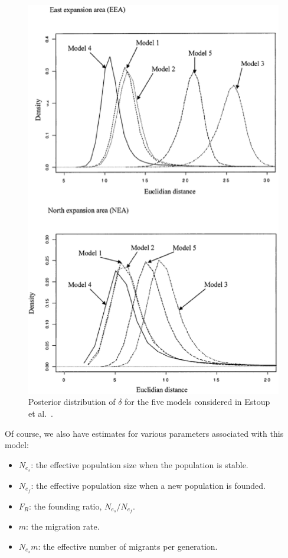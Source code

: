 \begin{figure}
\begin{center}
\includegraphics[width=4.5in]{cane-toad-models.eps}
\end{center}
\caption{Posterior distribution of $\delta$ for the five models
  considered in Estoup et al.~\cite{Estoup-etal-2004}.}\label{fig:cane-toad-models}
\end{figure}

Of course, we also have estimates for various parameters associated
with this model: 

\begin{itemize}

\item $N_{e_s}$: the effective population size when the population is
  stable.

\item $N_{e_f}$: the effective population size when a new population
  is founded.

\item $F_R$: the founding ratio, $N_{e_s}/N_{e_f}$.

\item $m$: the migration rate.

\item $N_{e_s}m$: the effective number of migrants per generation.

\end{itemize}

